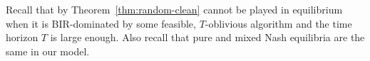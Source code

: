 Recall that by Theorem~\ref{thm:random-clean} \DynGreedy cannot be played in equilibrium when it is BIR-dominated by some feasible, $T$-oblivious algorithm and the time horizon $T$ is large enough. Also recall that pure and mixed Nash equilibria are the same in our model.






